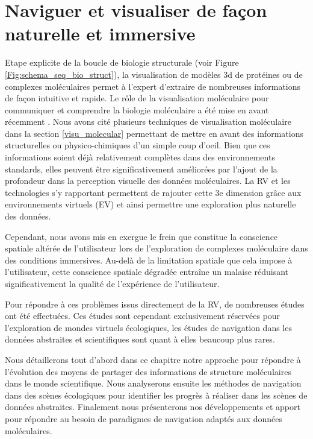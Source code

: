 
\chapter[Exploration interactive de données moléculaire en immersion]{Naviguer et visualiser de façon naturelle et immersive}
\label{Sec:CantorDigitalis}
\minitoc
\cleardoublepage

Etape explicite de la boucle de biologie structurale (voir Figure \ref{Fig:schema_seq_bio_struct}), la visualisation de modèles 3d de protéines ou de complexes moléculaires permet à l'expert d'extraire de nombreuses informations de façon intuitive et rapide. Le rôle de la visualisation moléculaire pour communiquer et comprendre la biologie moléculaire a été mise en avant récemment \cite{}.
Nous avons cité plusieurs techniques de visualisation moléculaire dans la section \ref{visu_molecular} permettant de mettre en avant des informations structurelles ou physico-chimiques d'un simple coup d'oeil. Bien que ces informations soient déjà relativement complètes dans des environnements standards, elles peuvent être significativement améliorées par l'ajout de la profondeur dans la perception visuelle des données moléculaires. La RV et les technologies s'y rapportant permettent de rajouter cette 3e dimension grâce aux environnements virtuels (EV) et ainsi permettre une exploration plus naturelle des données.

Cependant, nous avons mis en exergue le frein que constitue la conscience spatiale altérée de l'utilisateur lors de l'exploration de complexes moléculaire dans des conditions immersives. Au-delà de la limitation spatiale que cela impose à l'utilisateur, cette conscience spatiale dégradée entraîne un malaise réduisant significativement la qualité de l'expérience de l'utilisateur. 

Pour répondre à ces problèmes issus directement de la RV, de nombreuses études ont été effectuées. Ces études sont cependant exclusivement réservées pour l'exploration de mondes virtuels écologiques, les études de navigation dans les données abstraites et scientifiques sont quant à elles beaucoup plus rares. 

Nous détaillerons tout d'abord dans ce chapitre notre approche pour répondre à l'évolution des moyens de partager des informations de structure moléculaires dans le monde scientifique. Nous analyserons ensuite les méthodes de navigation dans des scènes écologiques pour identifier les progrès à réaliser dans les scènes de données abstraites. Finalement nous présenterons nos développements et apport pour répondre au besoin de paradigmes de navigation adaptés aux données moléculaires.

